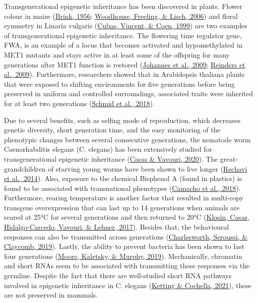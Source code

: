 \documentclass[12pt,twoside]{reedthesis}
\begin{document}
Transgenerational epigenetic inheritance has been discovered in plants.
Flower colour in maize (\protect\hyperlink{ref-brink1956}{Brink, 1956}; \protect\hyperlink{ref-woodhouse2006}{Woodhouse, Freeling, \& Lisch, 2006}) and floral symmetry
in Linaria vulgaris (\protect\hyperlink{ref-cubas1999}{Cubas, Vincent, \& Coen, 1999}) are two examples of transgenerational
epigenetic inheritance. The flowering time regulator gene, FWA, is an
example of a locus that becomes activated and hypomethylated in MET1
mutants and stays active in at least some of the offspring for many
generations after MET1 function is restored (\protect\hyperlink{ref-johannes2009}{Johannes et al., 2009}; \protect\hyperlink{ref-reinders2009}{Reinders et al., 2009}). Furthermore, researchers showed that in Arabidopsis
thaliana plants that were exposed to shifting environments for five
generations before being preserved in uniform and controlled
surroundings, associated traits were inherited for at least two
generations (\protect\hyperlink{ref-schmid2018}{Schmid et al., 2018}).

Due to several benefits, such as selfing mode of reproduction, which
decreases genetic diversity, short generation time, and the easy
monitoring of the phenotypic changes between several consecutive
generations, the nematode worm Caenorhabditis elegans (C. elegans) has
been extensively studied for transgenerational epigenetic inheritance
(\protect\hyperlink{ref-casas2020}{Casas \& Vavouri, 2020}). The great-grandchildren of starving young worms have been
shown to live longer (\protect\hyperlink{ref-rechavi2014}{Rechavi et al., 2014}). Also, exposure to the chemical
Bisphenol A (found in plastics) is found to be associated with
transnational phenotypes (\protect\hyperlink{ref-camacho2018}{Camacho et al., 2018}). Furthermore, rearing
temperature is another factor that resulted in multi-copy transgene
overexpression that can last up to 14 generations when animals are
reared at 25°C for several generations and then returned to 20°C
(\protect\hyperlink{ref-klosin2017}{Klosin, Casas, Hidalgo-Carcedo, Vavouri, \& Lehner, 2017}). Besides that, the behavioural responses can also be
transmitted across generations (\protect\hyperlink{ref-charlesworth2019}{Charlesworth, Seroussi, \& Claycomb, 2019}). Lastly, the ability
to prevent bacteria has been shown to last four generations
(\protect\hyperlink{ref-moore2019}{Moore, Kaletsky, \& Murphy, 2019}). Mechanically, chromatin and short RNAs seem to be
associated with transmitting these responses via the germline. Despite
the fact that there are well-studied short RNA pathways involved in
epigenetic inheritance in C. elegans (\protect\hyperlink{ref-ketting2021}{Ketting \& Cochella, 2021}), these are not
preserved in mammals.
\end{document}

